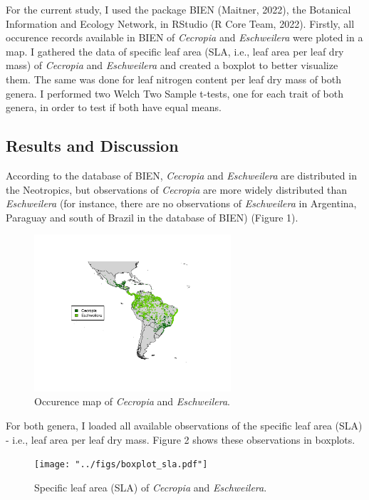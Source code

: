 \documentclass[
  10.5pt,
]{article}
\begin{document}
For the current study, I used the package BIEN (Maitner, 2022), the
Botanical Information and Ecology Network, in RStudio (R Core Team,
2022). Firstly, all occurence records available in BIEN of
\emph{Cecropia} and \emph{Eschweilera} were ploted in a map. I gathered
the data of specific leaf area (SLA, i.e., leaf area per leaf dry mass)
of \emph{Cecropia} and \emph{Eschweilera} and created a boxplot to
better visualize them. The same was done for leaf nitrogen content per
leaf dry mass of both genera. I performed two Welch Two Sample t-tests,
one for each trait of both genera, in order to test if both have equal
means.

\hypertarget{results-and-discussion}{%
\subsection{Results and Discussion}\label{results-and-discussion}}

According to the database of BIEN, \emph{Cecropia} and
\emph{Eschweilera} are distributed in the Neotropics, but observations
of \emph{Cecropia} are more widely distributed than \emph{Eschweilera}
(for instance, there are no observations of \emph{Eschweilera} in
Argentina, Paraguay and south of Brazil in the database of BIEN) (Figure
1).

\begin{figure}
\centering
\includegraphics[width=0.65\textwidth,height=\textheight]{"../figs/map_occurence.pdf"}
\caption{Occurence map of \emph{Cecropia} and \emph{Eschweilera}.}
\end{figure}

For both genera, I loaded all available observations of the specific
leaf area (SLA) - i.e., leaf area per leaf dry mass. Figure 2 shows
these observations in boxplots.

\begin{figure}
\centering
\texttt{[image: "../figs/boxplot\_sla.pdf"]}
\caption{Specific leaf area (SLA) of \emph{Cecropia} and
\emph{Eschweilera}.}
\end{figure}
\end{document}
